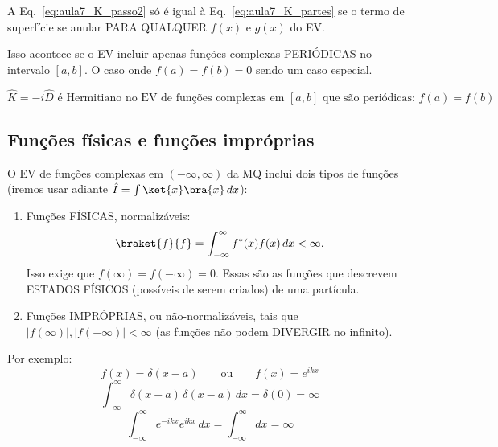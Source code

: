 A Eq.~\eqref{eq:aula7_K_passo2} só é igual à Eq.~\eqref{eq:aula7_K_partes} se o termo de superfície se anular PARA QUALQUER $f(x)$ e $g(x)$ do EV.

Isso acontece se o EV incluir apenas funções complexas PERIÓDICAS no intervalo $[a,b]$. O caso onde $f(a)=f(b)=0$ sendo um caso especial.

\begin{equation}
\boxed{\hat{K} = -i\hat{D} \text{ é Hermitiano no EV de funções complexas em } [a,b] \text{ que são periódicas: } f(a)=f(b)}
\label{eq:aula7_K_hermitiano_resultado}
\end{equation}

\subsection*{Funções físicas e funções impróprias}

O EV de funções complexas em $(-\infty,\infty)$ da MQ inclui dois tipos de funções (iremos usar adiante $\hat{I} = \int \ket{x}\bra{x}\,dx$):

\begin{enumerate}
\item[(i)] Funções FÍSICAS, normalizáveis:
\begin{equation}
\braket{f}{f} = \int_{-\infty}^{\infty} f^*(x) f(x)\,dx < \infty.
\label{eq:aula7_funcao_fisica}
\end{equation}
Isso exige que $f(\infty) = f(-\infty) = 0$. Essas são as funções que descrevem ESTADOS FÍSICOS (possíveis de serem criados) de uma partícula.

\item[(ii)] Funções IMPRÓPRIAS, ou não-normalizáveis, tais que $|f(\infty)|, |f(-\infty)| < \infty$ (as funções não podem DIVERGIR no infinito).
\end{enumerate}

Por exemplo:
\begin{equation}
f(x) = \delta(x-a) \qquad \text{ou} \qquad f(x) = e^{ikx}
\label{eq:aula7_funcao_impropria_exemplo}
\end{equation}
\begin{equation}
\int_{-\infty}^{\infty} \delta(x-a)\,\delta(x-a)\,dx = \delta(0) = \infty
\label{eq:aula7_funcao_impropria_delta}
\end{equation}
\begin{equation}
\int_{-\infty}^{\infty} e^{-ikx}e^{ikx}\,dx = \int_{-\infty}^{\infty} dx = \infty
\label{eq:aula7_funcao_impropria_exp}
\end{equation}

